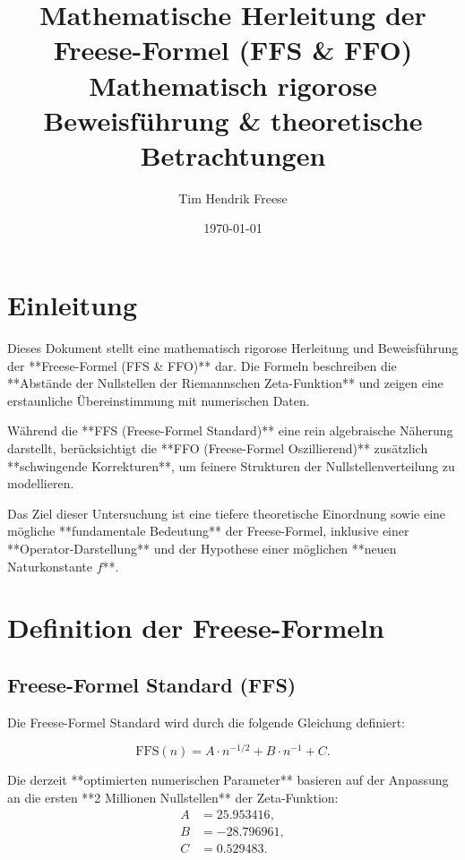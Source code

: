 \documentclass[a4paper,12pt]{article}
\title{\textbf{Mathematische Herleitung der Freese-Formel (FFS \& FFO)} \\ 
\large Mathematisch rigorose Beweisführung \& theoretische Betrachtungen}
\author{Tim Hendrik Freese}
\date{\today}
\begin{document}
\maketitle
\tableofcontents
\newpage

\section{Einleitung}
Dieses Dokument stellt eine mathematisch rigorose Herleitung und Beweisführung der **Freese-Formel (FFS \& FFO)** dar.  
Die Formeln beschreiben die **Abstände der Nullstellen der Riemannschen Zeta-Funktion** und zeigen eine erstaunliche Übereinstimmung mit numerischen Daten.

Während die **FFS (Freese-Formel Standard)** eine rein algebraische Näherung darstellt, berücksichtigt die **FFO (Freese-Formel Oszillierend)** zusätzlich **schwingende Korrekturen**, um feinere Strukturen der Nullstellenverteilung zu modellieren.

Das Ziel dieser Untersuchung ist eine tiefere theoretische Einordnung sowie eine mögliche **fundamentale Bedeutung** der Freese-Formel, inklusive einer **Operator-Darstellung** und der Hypothese einer möglichen **neuen Naturkonstante \( f \)**.

\newpage

\section{Definition der Freese-Formeln}

\subsection{Freese-Formel Standard (FFS)}
Die Freese-Formel Standard wird durch die folgende Gleichung definiert:

\begin{equation}
    \text{FFS}(n) = A \cdot n^{-1/2} + B \cdot n^{-1} + C.
\end{equation}

Die derzeit **optimierten numerischen Parameter** basieren auf der Anpassung an die ersten **2 Millionen Nullstellen** der Zeta-Funktion:
\begin{align*}
    A &= 25.953416, \\
    B &= -28.796961, \\
    C &= 0.529483.
\end{align*}
\end{document}
